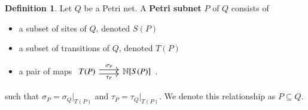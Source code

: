 \documentclass[aps,prd,onecolumn,nofootinbib,letterpaper,preprintnumbers,superscriptaddress,eqsecnum]{revtex4}
\theoremstyle{definition}
\newtheorem{definition}{Definition}
\newcommand{\N}{\mathbb{N}}
\begin{document}
\begin{definition}\label{def:subnet}
    Let $Q$ be a Petri net. A \textbf{Petri subnet} $P$ of $Q$ consists of
    \begin{itemize}
        \item a subset of sites of $Q$, denoted $S(P)$
        \item a subset of transitions of $Q$, denoted $T(P)$
        \item a pair of maps $\begin{tikzcd}
                T(P)
                \arrow[r, shift left = 1, "\sigma_P"]
                \arrow[r, shift right = 1, "\tau_P", swap]
                &
                \N[S(P)]
        \end{tikzcd}$.
    \end{itemize}
    such that $\sigma_P = \sigma_Q|_{T(P)}$ and $\tau_P = \tau_Q|_{T(P)}$.
    We denote this relationship as $P \subseteq Q$.
\end{definition}
\end{document}
